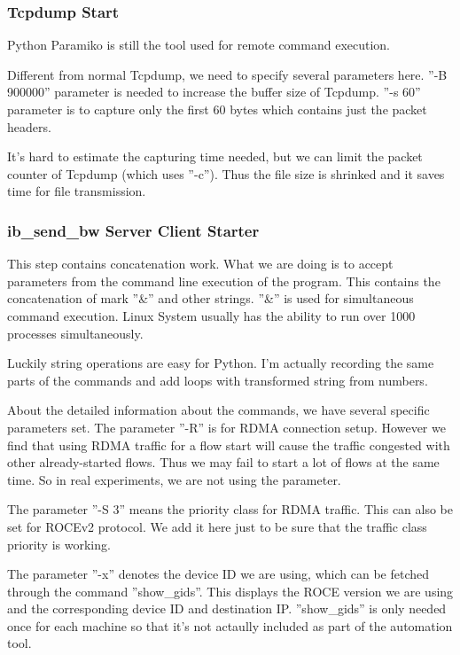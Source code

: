 \documentclass{article}
\begin{document}
\subsubsection{Tcpdump Start}
Python Paramiko is still the tool used for remote command execution.

Different from normal Tcpdump, we need to specify several parameters here.
''-B 900000'' parameter is needed to increase the buffer size of Tcpdump.
''-s 60'' parameter is to capture only the first 60 bytes which contains just the packet headers.

It's hard to estimate the capturing time needed, but we can limit the packet counter of Tcpdump (which uses ''-c'').
Thus the file size is shrinked and it saves time for file transmission.

\subsubsection{ib\_send\_bw Server Client Starter}

This step contains concatenation work.
What we are doing is to accept parameters from the command line execution of the program.
This contains the concatenation of mark ''\&'' and other strings.
''\&'' is used for simultaneous command execution. Linux System usually has the ability to run over 1000 processes simultaneously.

Luckily string operations are easy for Python.
I'm actually recording the same parts of the commands and add loops with transformed string from numbers.

About the detailed information about the commands, we have several specific parameters set.
The parameter ''-R'' is for RDMA connection setup. However we find that using RDMA traffic for a flow start will cause
the traffic congested with other already-started flows. Thus we may fail to start a lot of flows at the same time.
So in real experiments, we are not using the parameter.

The parameter ''-S 3'' means the priority class for RDMA traffic. This can also be set for ROCEv2 protocol.
We add it here just to be sure that the traffic class priority is working.

The parameter ''-x'' denotes the device ID we are using, which can be fetched through the command ''show\_gids''.
This displays the ROCE version we are using and the corresponding device ID and destination IP.
''show\_gids'' is only needed once for each machine so that it's not actaully included as part of the automation tool.
\end{document}
